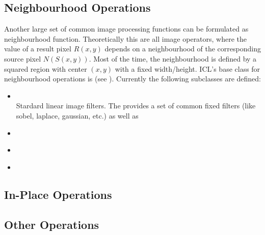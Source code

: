 \subsection{Neighbourhood Operations\label{subsec:nbh-ops}}
Another large set of common image processing functions can be formulated as neighbourhood function. Theoretically this are all image operators, where the value of a result pixel $R(x,y)$ depends on a neighbourhood of the corresponding source pixel $N(S(x,y))$. Most of the time, the neighbourhood is defined by a squared region with center $(x,y)$ with a fixed width/height. ICL's base class for neighbourhood operations is  (see ). Currently the following subclasses are defined:

\begin{itemize}
\item \textbf{}\\
Stardard linear image filters. The  provides a set of common fixed filters (like sobel, laplace, gaussian, etc.) as well as 
\item \textbf{}\\
\item \textbf{}\\
\item \textbf{}\\
\end{itemize}

\subsection{In-Place Operations\label{subsec:inplace-ops}}

\subsection{Other Operations\label{subsec:other-ops}} 

